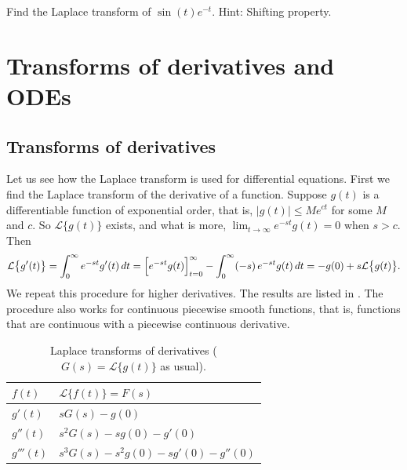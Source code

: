 \begin{exercise}
Find the Laplace transform of $\sin(t)e^{-t}$.  Hint: Shifting property.
\end{exercise}



\sectionnewpage
\section{Transforms of derivatives and ODEs}
\label{transformsofders:section}



\subsection{Transforms of derivatives}

Let us see how the Laplace transform is used for differential equations.
First we find the Laplace transform of the derivative of a function.
Suppose $g(t)$ is a differentiable function
of exponential order, that is, $\lvert g(t) \rvert \leq M e^{ct}$ for some
$M$ and $c$.  So $\mathcal{L} \bigl\{ g(t) \bigr\}$ exists, and what is more,
$\lim_{t\to\infty} e^{-st}g(t) = 0$ when $s > c$.  Then
\begin{equation*}
\mathcal{L} \bigl\{ g'(t) \bigr\}
=
\int_0^\infty
e^{-st}
g'(t) \,dt
=
\Bigl[e^{-st} g(t) \Bigr]_{t=0}^\infty
-
\int_0^\infty
(-s)\,
e^{-st}
g(t) \,dt
=
-g(0) + s \mathcal{L} \bigl\{ g(t) \bigr\} .
\end{equation*}
We repeat this procedure for higher derivatives.
The results are
listed in .  The procedure also works for continuous piecewise
smooth functions, that is, functions that are continuous with a
piecewise continuous derivative.

\begin{table}[h!t]
\mybeginframe
\capstart
\begin{center}
\begin{tabular}{@{}ll@{}}
\toprule
$f(t)$ & $\mathcal{L} \bigl\{ f(t) \bigr\} = F(s)$ \\
\midrule
$g'(t)$ & $sG(s)-g(0)$ \\[4pt]
$g''(t)$ & $s^2G(s)-sg(0)-g'(0)$ \\[4pt]
$g'''(t)$ & $s^3G(s)-s^2g(0)-sg'(0)-g''(0)$ \\[4pt]
\bottomrule
\end{tabular}
\end{center}
\caption{Laplace transforms of derivatives
($G(s) = \mathcal{L} \bigl\{ g(t) \bigr\}$
as usual).\label{ltd:table}}
\myendframe
\end{table}

